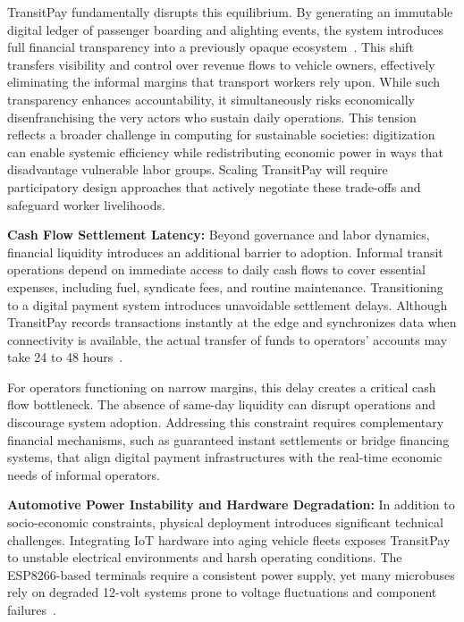 \documentclass[manuscript,review,anonymous]{acmart}
\begin{document}
TransitPay fundamentally disrupts this equilibrium. By generating an immutable digital ledger of passenger boarding and alighting events, the system introduces full financial transparency into a previously opaque ecosystem~\cite{annapurnaexpress2026article}. This shift transfers visibility and control over revenue flows to vehicle owners, effectively eliminating the informal margins that transport workers rely upon. While such transparency enhances accountability, it simultaneously risks economically disenfranchising the very actors who sustain daily operations. This tension reflects a broader challenge in computing for sustainable societies: digitization can enable systemic efficiency while redistributing economic power in ways that disadvantage vulnerable labor groups. Scaling TransitPay will require participatory design approaches that actively negotiate these trade-offs and safeguard worker livelihoods.

\textbf{Cash Flow Settlement Latency:} 
Beyond governance and labor dynamics, financial liquidity introduces an additional barrier to adoption. Informal transit operations depend on immediate access to daily cash flows to cover essential expenses, including fuel, syndicate fees, and routine maintenance. Transitioning to a digital payment system introduces unavoidable settlement delays. Although TransitPay records transactions instantly at the edge and synchronizes data when connectivity is available, the actual transfer of funds to operators’ accounts may take 24 to 48 hours~\cite{klein2023transitpayments}.

For operators functioning on narrow margins, this delay creates a critical cash flow bottleneck. The absence of same-day liquidity can disrupt operations and discourage system adoption. Addressing this constraint requires complementary financial mechanisms, such as guaranteed instant settlements or bridge financing systems, that align digital payment infrastructures with the real-time economic needs of informal operators.


\textbf{Automotive Power Instability and Hardware Degradation:} 
In addition to socio-economic constraints, physical deployment introduces significant technical challenges. Integrating IoT hardware into aging vehicle fleets exposes TransitPay to unstable electrical environments and harsh operating conditions. The ESP8266-based terminals require a consistent power supply, yet many microbuses rely on degraded 12-volt systems prone to voltage fluctuations and component failures~\cite{IJCRT2022VehicleIoT,VoltageDrop12V2025}.
\end{document}
